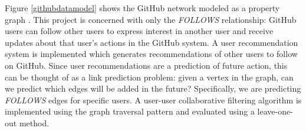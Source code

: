 Figure \ref{githubdatamodel} shows the GitHub network modeled as a property graph \cite{Rodriguez}. This project is concerned with only the \textit{FOLLOWS} relationship: GitHub users can follow other users to express interest in another user and receive updates about that user's actions in the GitHub system. A user recommendation system is implemented which generates recommendations of other users to follow on GitHub. Since user recommendations are a prediction of future action, this can be thought of as a link prediction problem: given a vertex in the graph, can we predict which edges will be added in the future? Specifically, we are predicting \textit{FOLLOWS} edges for specific users. A user-user collaborative filtering algorithm is implemented using the graph traversal pattern \cite{Rodriguez} and evaluated using a leave-one-out method. 
